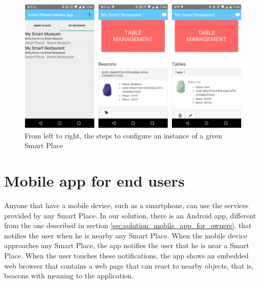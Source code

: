 \begin{figure}[!ht]
  \centering
    \includegraphics[width=1\textwidth, keepaspectratio]{images/screenshots/ownersapp_configure}
    \caption[Configure a Smart Place Instance]{From left to right, the steps to configure an instance of a given Smart Place}
    \label{fig:screenshot_ownersapp_configure}
\end{figure}

\section{Mobile app for end users}
\label{sec:solution_mobile_app_for_end_users}
Anyone that have a mobile device, such as a smartphone, can use the services provided by any Smart Place.
In our solution, there is an Android app, different from the one described in section \ref{sec:solution_mobile_app_for_owners}, that notifies the user when he is nearby any Smart Place.
When the mobile device approaches any Smart Place, the app notifies the user that he is near a Smart Place.
When the user touches these notifications, the app shows an embedded web browser that contains a web page that can react to nearby objects, that is, beacons with meaning to the application.

